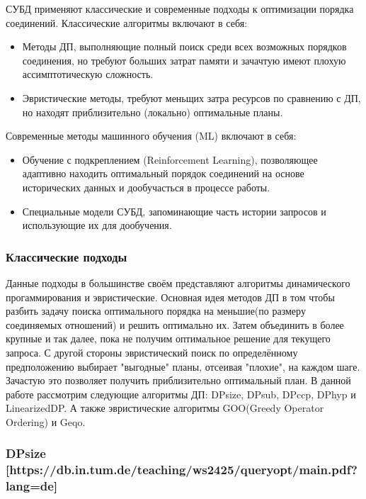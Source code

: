 \documentclass[12pt]{article}
\begin{document}
\begin{flushleft}
СУБД применяют классические и современные подходы к оптимизации 
порядка соединений.
\newline
Классические алгоритмы включают в себя:
\begin{itemize}
\item Методы ДП, выполняющие полный поиск среди всех возможных порядков
соединения, но требуют больших затрат памяти и зачачтую имеют плохую
ассимптотическую сложность.
\item Эвристические методы, требуют меньщих затра ресурсов по сравнению
с ДП, но находят приблизительно (локально) оптимальные планы.
\end{itemize}
Современные методы машинного обучения (ML) включают в себя:
\begin{itemize}
\item Обучение с подкреплением (Reinforcement Learning), позволяющее 
адаптивно находить оптимальный порядок соединений на основе исторических 
данных и дообучасться в процессе работы.
\item Специальные модели СУБД, запоминающие часть истории запросов и использующие их
для дообучения.
\end{itemize}

\centering \subsubsection*{Классические подходы}
\raggedright
Данные подходы в большинстве своём представляют алгоритмы динамического
прогаммирования и эвристические.
\newline
Основная идея методов ДП в том чтобы разбить задачу поиска оптимального
порядка на меньшие(по размеру соединяемых отношений) и решить оптимально их. Затем 
объединить в более крупные и так далее, пока не получим оптимальное решение 
для текущего запроса.
\newline
С другой стороны эвристический поиск по определённому предположению выбирает
"выгодные" планы, отсеивая "плохие", на каждом шаге. Зачастую это позволяет
получить приблизительно оптимальный план.
\newline
В данной работе рассмотрим следующие алгоритмы ДП: DPsize, DPsub, DPccp, 
DPhyp и LinearizedDP. А также эвристические алгоритмы GOO(Greedy Operator Ordering) и 
Geqo.

\centering \subsubsection*{DPsize [https://db.in.tum.de/teaching/ws2425/queryopt/main.pdf?lang=de]} 
\raggedright


\end{flushleft}
\end{document}
